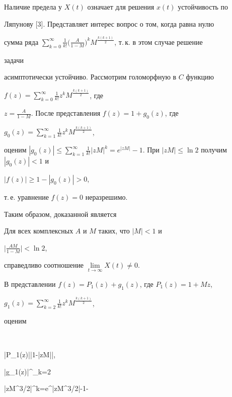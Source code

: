  


Наличие предела у $X(t)$ означает для решения $x(t)$ устойчивость по 


Ляпунову [3]. Представляет интерес вопрос о том, когда равна нулю 


сумма ряда $\sum\limits^\infty_{k=0} \frac{1}{k!}\big( 


\frac{A}{1-M}\big)^k M^{\frac{k(k+1)}{2}}$, т.\,к. в этом случае решение 


задачи 


асимптотически устойчиво. Рассмотрим голоморфную в $C$ функцию 


$f(z)=\sum\limits^\infty_{k=0}\frac{1}{k!}z^k M^{\frac{k(k+1)}{2}}$, где 


$z=\frac{A}{1-M}$. После представления $f(z)=1+g_0(z)$, где 


$g_0(z)=\sum\limits^\infty_{k=1}\frac{1}{k!}z^k M^{\frac{k(k+1)}{2}}$, 


оценим $|g_0(z)|\le\sum\limits^\infty_{k=1} \frac{1}{k!}|zM|^k= 


e^{|zM|}-1$. При $|zM|\le\ln2$ получим $|g_0(z)|<1$ и 


$|f(z)|\ge1-|g_0(z)|>0$, 


т.\,е. уравнение $f(z)=0$ неразрешимо. 


 


Таким образом, доказанной является 


 


\begin{thm} 


Для всех комплексных $A$ и $M$ таких, что $|M|<1$ и 


$\big|\frac{AM}{1-M}\big|<\ln2$, 


справедливо соотношение $\lim\limits_{t\to\infty}X(t)\ne0$. 


\end{thm} 


 


В представлении $f(z)=P_1(z)+g_1(z)$, где $P_1(z)=1+Mz$, 


$g_1(z)=\sum\limits^\infty_{k=2} \frac{1}{k!}z^k M^{\frac{k(k+1)}{2}}$, 


оценим 


$$ 


|P_1(z)|\ge\big|1-|zM|\big|,\quad 


|g_1(z)|\le\sum^\infty_{k=2} 


|zM^{3/2}|^k=e^{|zM^{3/2}|}-1- 


